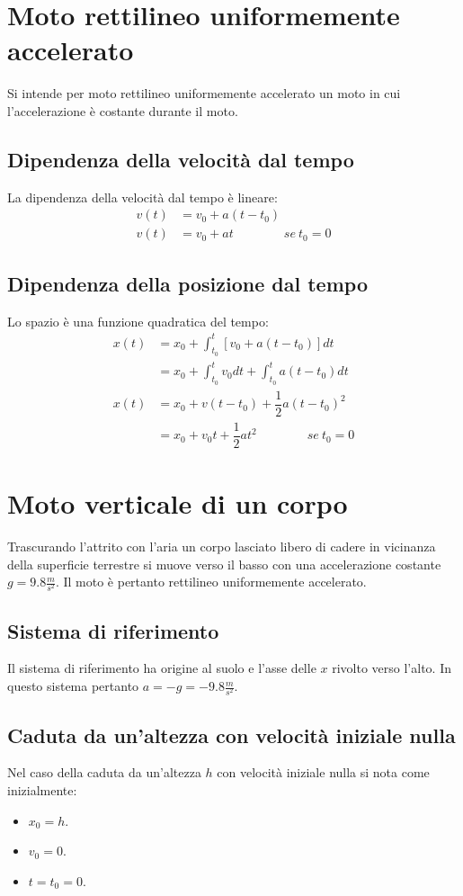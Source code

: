 \documentclass[class=book, crop=false, oneside, 12pt]{standalone}
\begin{document}
\section{Moto rettilineo uniformemente accelerato}
Si intende per moto rettilineo uniformemente accelerato un moto in cui l'accelerazione \`e costante durante il moto.
  \subsection{Dipendenza della velocit\`a dal tempo}
	La dipendenza della velocit\`a dal tempo \`e lineare:
	\begin{align*}
	  v(t) &=v_0+a(t-t_0)\\
		v(t) &=v_0+at\qquad\qquad se\ t_0 = 0
	\end{align*}
	\subsection{Dipendenza della posizione dal tempo}
	Lo spazio \`e una funzione quadratica del tempo:
	\begin{align*}
		x(t) &= x_0 +\int_{t_0}^t [v_0 + a(t-t_0)]dt\\
	       &= x_0 + \int_{t_0}^t v_0dt + \int_{t_0}^t a(t-t_0)dt\\
	  x(t) &= x_0 + v(t-t_0) +\dfrac{1}{2}a(t-t_0)^2\\
		     &= x_0 + v_0t +\dfrac{1}{2}at^2\qquad\qquad se\ t_0 = 0
	\end{align*}
\section{Moto verticale di un corpo}
Trascurando l'attrito con l'aria un corpo lasciato libero di cadere in vicinanza della superficie terrestre si muove verso il basso con una accelerazione costante $g=9.8\frac{m}{s^2}$.
Il moto \`e pertanto rettilineo uniformemente accelerato.
	\subsection{Sistema di riferimento}
	Il sistema di riferimento ha origine al suolo e l'asse delle $x$ rivolto verso l'alto.
	In questo sistema pertanto $a=-g=-9.8\frac{m}{s^2}$.
	\subsection{Caduta da un'altezza con velocit\`a iniziale nulla}
	Nel caso della caduta da un'altezza $h$ con velocit\`a iniziale nulla si nota come inizialmente:
	\begin{multicols}{3}
		\begin{itemize}
			\item $x_0 = h$.
			\item $v_0 = 0$.
			\item $t = t_0 = 0$.
		\end{itemize}
	\end{multicols}
\end{document}
